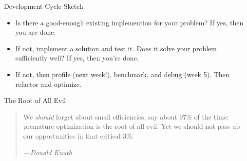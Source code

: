 \documentclass[
  ignorenonframetext,
  aspectratio=1610,
  onlytextwidth]{beamer}
\providecommand{\tightlist}{}
\begin{document}
\begin{frame}{Development Cycle Sketch}
\label{development-cycle-sketch}
\begin{itemize}
\tightlist
\item
  Is there a good-enough existing implemention for your problem? If yes,
  then you are done.
\item
  If not, implement a solution and test it. Does it solve your problem
  sufficiently well? If yes, then you're done.
\item
  If not, then profile (next week!), benchmark, and debug (week 5). Then
  refactor and optimize.
\end{itemize}

\pause

\begin{block}{The Root of All Evil}
\label{the-root-of-all-evil}
\medskip

\begin{quote}
We \emph{should} forget about small efficiencies, say about 97\% of the
time: premature optimization is the root of all evil. Yet we should not
pass up our opportunities in that critical 3\%.

\emph{---Donald Knuth}
\end{quote}
\end{block}
\end{frame}
\end{document}
